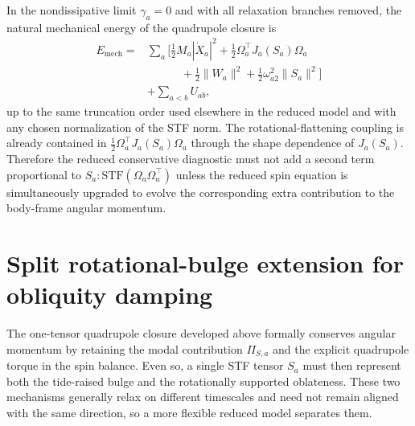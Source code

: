 \documentclass[journal, a4paper]{IEEEtran}
\begin{document}
In the nondissipative limit $\gamma_a=0$ and with all relaxation branches
removed, the natural mechanical energy of the quadrupole closure is
\begin{align}
E_{\mathrm{mech}}
=
&\sum_a \Biggl[
\frac{1}{2}M_a|\dot X_a|^2
+\frac{1}{2}\Omega_a^\top J_a(S_a)\Omega_a \nonumber\\
&\qquad\quad+\frac{1}{2}\|W_a\|^2
+\frac{1}{2}\omega_{a2}^2\|S_a\|^2
\Biggr]
\nonumber\\
&
+\sum_{a<b} U_{ab},
\label{eq:Emechquad}
\end{align}
up to the same truncation order used elsewhere in the reduced model and with
any chosen normalization of the STF norm. The rotational-flattening coupling
is already contained in $\frac{1}{2}\Omega_a^\top J_a(S_a)\Omega_a$ through the
shape dependence of $J_a(S_a)$. Therefore the reduced conservative diagnostic
must not add a second term proportional to
$S_a:\mathrm{STF}(\Omega_a\Omega_a^\top)$ unless the reduced spin equation is
simultaneously upgraded to evolve the corresponding extra contribution to the
body-frame angular momentum.


\section{Split rotational-bulge extension for obliquity damping}

The one-tensor quadrupole closure developed above formally conserves angular
momentum by retaining the modal contribution $\Pi_{S,a}$ and the explicit
quadrupole torque in the spin balance. Even so, a single STF tensor $S_a$ must
then represent both the tide-raised bulge and the rotationally supported
oblateness. These two mechanisms generally relax on different timescales and
need not remain aligned with the same direction, so a more flexible reduced
model separates them.
\end{document}
